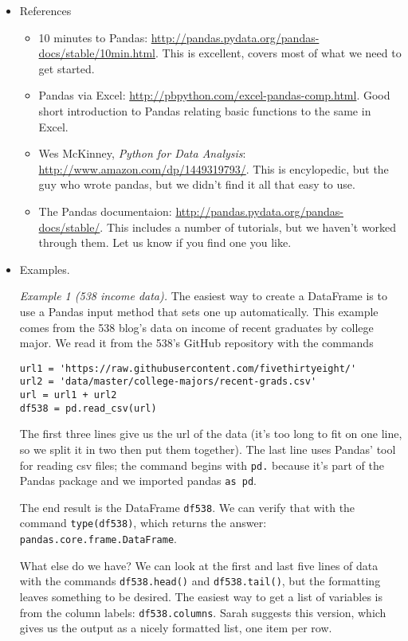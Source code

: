 \documentclass[11pt]{article}
\begin{document}
\begin{itemize}
\item References
\begin{itemize}
\item 10 minutes to Pandas:  \url{http://pandas.pydata.org/pandas-docs/stable/10min.html}.
This is excellent, covers most of what we need to get started.

\item Pandas via Excel:  \url{http://pbpython.com/excel-pandas-comp.html}.
Good short introduction to Pandas relating basic functions to the same in Excel.  

\item Wes McKinney, {\it Python for Data Analysis\/}: \url{http://www.amazon.com/dp/1449319793/}.
This is encylopedic, but the guy who wrote pandas, but we didn't find it all that easy
to use.

\item The Pandas documentaion:  \url{http://pandas.pydata.org/pandas-docs/stable/}.
This includes a number of tutorials, but we haven't worked through them.
Let us know if you find one you like.
\end{itemize}

\item Examples.

{\it Example 1 (538 income data).\/}
The easiest way to create a DataFrame is to use a Pandas input method
that sets one up automatically.
This example comes from the 538 blog's data on income of recent graduates by
college major.
We read it from the 538's GitHub repository with the commands
\begin{verbatim}
url1 = 'https://raw.githubusercontent.com/fivethirtyeight/'
url2 = 'data/master/college-majors/recent-grads.csv'
url = url1 + url2
df538 = pd.read_csv(url)
\end{verbatim}
The first three lines give us the url of the data
(it's too long to fit on one line, so we split it in two
then put them together).
The last line uses Pandas' tool for reading csv files;
the command begins with {\tt pd.} because it's part of the Pandas
package and we imported pandas {\tt as pd}.

The end result is the DataFrame {\tt df538}.
We can verify that with the command {\tt type(df538)},
which returns the answer:  {\tt pandas.core.frame.DataFrame}.

What else do we have?
We can look at the first and last five lines of data with the
commands {\tt df538.head()} and {\tt df538.tail()},
but the formatting leaves something to be desired.
The easiest way to get a list of variables is from the column labels:
{\tt df538.columns}.
Sarah suggests this version, which gives us the output as a nicely formatted list,
one item per row.


\end{itemize}
\end{document}
